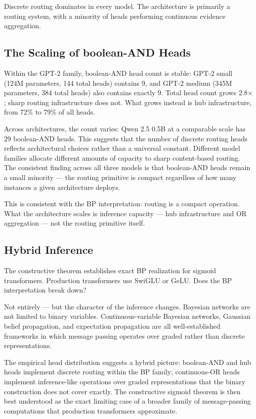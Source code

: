 Discrete routing dominates in every model. The architecture is primarily a routing system, with a minority of heads performing continuous evidence aggregation.

\subsection*{The Scaling of boolean-AND Heads}

Within the GPT-2 family, boolean-AND head count is stable: GPT-2 small (124M parameters, 144 total heads) contains 9, and GPT-2 medium (345M parameters, 384 total heads) also contains exactly 9. Total head count grows 2.8$\times$; sharp routing infrastructure does not. What grows instead is hub infrastructure, from 72\% to 79\% of all heads.

Across architectures, the count varies: Qwen 2.5 0.5B at a comparable scale has 29 boolean-AND heads. This suggests that the number of discrete routing heads reflects architectural choices rather than a universal constant. Different model families allocate different amounts of capacity to sharp content-based routing. The consistent finding across all three models is that boolean-AND heads remain a small minority --- the routing primitive is compact regardless of how many instances a given architecture deploys.

This is consistent with the BP interpretation: routing is a compact operation. What the architecture scales is inference capacity --- hub infrastructure and OR aggregation --- not the routing primitive itself.

\subsection*{Hybrid Inference}

The constructive theorem establishes exact BP realization for sigmoid transformers. Production transformers use SwiGLU or GeLU. Does the BP interpretation break down?

Not entirely --- but the character of the inference changes. Bayesian networks are not limited to binary variables. Continuous-variable Bayesian networks, Gaussian belief propagation, and expectation propagation are all well-established frameworks in which message passing operates over graded rather than discrete representations.

The empirical head distribution suggests a hybrid picture: boolean-AND and hub heads implement discrete routing within the BP family; continuous-OR heads implement inference-like operations over graded representations that the binary construction does not cover exactly. The constructive sigmoid theorem is then best understood as the exact limiting case of a broader family of message-passing computations that production transformers approximate.

